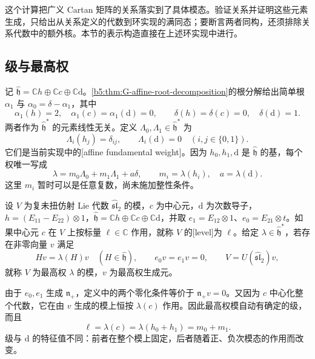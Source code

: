 这个计算把广义 Cartan 矩阵的关系落实到了具体模态。验证关系并证明这些元素生成，只给出从关系定义的代数到环实现的满同态；要断言两者同构，还须排除关系代数中的额外核。本节的表示构造直接在上述环实现中进行。

\subsection{级与最高权}
\label{b5:subsec:G03:02}

记 \(\widehat{\mathfrak h}=\mathbb Ch\oplus\mathbb Cc\oplus\mathbb C\mathrm d\)。\cref{b5:thm:G-affine-root-decomposition}的根分解给出简单根 \(\alpha_1\) 与 \(\alpha_0=\delta-\alpha_1\)，其中
\[
	\alpha_1(h)=2,\quad \alpha_1(c)=\alpha_1(\mathrm d)=0,
	\qquad \delta(h)=\delta(c)=0,\quad\delta(\mathrm d)=1.
\]
两者作为 \(\widehat{\mathfrak h}^*\) 的元素线性无关。定义 \(\Lambda_0,\Lambda_1\in\widehat{\mathfrak h}^*\) 为
\[
	\Lambda_i(h_j)=\delta_{ij},\qquad \Lambda_i(\mathrm d)=0
	\quad(i,j\in\{0,1\}).
\]
它们是当前实现中的[affine fundamental weight]。因为 \(h_0,h_1,\mathrm d\) 是 \(\widehat{\mathfrak h}\) 的基，每个权唯一写成
\[
	\lambda=m_0\Lambda_0+m_1\Lambda_1+a\delta,
	\qquad m_i=\lambda(h_i),\quad a=\lambda(\mathrm d).
\]
这里 \(m_i\) 暂时可以是任意复数，尚未施加整性条件。

\begin{definition}\label{b5:def:G-level-highest}
	设 \(V\) 为复未扭仿射 Lie 代数 \(\widehat{\mathfrak{sl}}_2\) 的模，\(c\) 为中心元，\(\mathrm d\) 为次数导子，\(h=(E_{11}-E_{22})\otimes1\)，\(\widehat{\mathfrak h}=\mathbb Ch\oplus\mathbb Cc\oplus\mathbb C\mathrm d\)，并取 \(e_1=E_{12}\otimes1\)、\(e_0=E_{21}\otimes t\)。如果中心元 \(c\) 在 \(V\) 上按标量 \(\ell\in\mathbb C\) 作用，就称 \(V\) 的[level]为 \(\ell\)。给定 \(\lambda\in\widehat{\mathfrak h}^*\)，若存在非零向量 \(v\) 满足
	\[
		Hv=\lambda(H)v\quad(H\in\widehat{\mathfrak h}),\qquad
		e_0v=e_1v=0,\qquad V=U(\widehat{\mathfrak{sl}}_2)v,
	\]
	就称 \(V\) 为最高权 \(\lambda\) 的模，\(v\) 为最高权生成元。
\end{definition}
由于 \(e_0,e_1\) 生成 \(\mathfrak n_+\)，定义中的两个零化条件等价于 \(\mathfrak n_+v=0\)。又因为 \(c\) 中心化整个代数，它在由 \(v\) 生成的模上恒按 \(\lambda(c)\) 作用。因此最高权模自动有确定的级，而且
\begin{equation}\label{b5:eq:G-level-sum}
	\ell=\lambda(c)=\lambda(h_0+h_1)=m_0+m_1.
\end{equation}
级与 \(\mathrm d\) 的特征值不同：前者在整个模上固定，后者随着正、负次模态的作用而改变。

